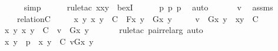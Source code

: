 \begin{isabellebody}
\ \ \ \ \isamarkupfalse%
\ simp\isanewline
\ \ \ \ \isamarkupfalse%
\ {\isacharparenleft}{\kern0pt}rule{\isacharunderscore}{\kern0pt}tac\ x{\isacharequal}{\kern0pt}{\isachardoublequoteopen}{\isacharless}{\kern0pt}x{\isacharcomma}{\kern0pt}y{\isachargreater}{\kern0pt}{\isachardoublequoteclose}\ \ bexI{\isacharparenright}{\kern0pt}\isanewline
\ \ \ \ \isamarkupfalse%
\ p{}\ p{}\ p{}\ \isamarkupfalse%
\ auto\ \isanewline
{}\isamarkupfalse%
\ \isanewline
\ \ \isamarkupfalse%
\ v\ \isamarkupfalse%
\ assms\ {\isacharcolon}{\kern0pt}\isanewline
\ \ \ \ {\isachardoublequoteopen}relation{\isacharparenleft}{\kern0pt}C{\isacharparenright}{\kern0pt}{\isachardoublequoteclose}\ \isanewline
\ \ \ \ {\isachardoublequoteopen}{\isasymforall}x{\isachardot}{\kern0pt}\ {\isasymforall}y{\isachardot}{\kern0pt}\ {\isacharless}{\kern0pt}x{\isacharcomma}{\kern0pt}\ y{\isachargreater}{\kern0pt}\ {\isasymin}\ C\ {\isasymlongrightarrow}\ F{\isacharparenleft}{\kern0pt}x{\isacharcomma}{\kern0pt}\ y{\isacharparenright}{\kern0pt}\ {\isacharequal}{\kern0pt}\ G{\isacharparenleft}{\kern0pt}x{\isacharcomma}{\kern0pt}\ y{\isacharparenright}{\kern0pt}{\isachardoublequoteclose}\ \isanewline
\ \ \ \ {\isachardoublequoteopen}v\ {\isasymin}\ {\isacharbraceleft}{\kern0pt}G{\isacharparenleft}{\kern0pt}x{\isacharcomma}{\kern0pt}\ y{\isacharparenright}{\kern0pt}\ {\isachardot}{\kern0pt}\ {\isasymlangle}x{\isacharcomma}{\kern0pt}y{\isasymrangle}\ {\isasymin}\ C{\isacharbraceright}{\kern0pt}{\isachardoublequoteclose}\isanewline
\ \ \isamarkupfalse%
\ \isamarkupfalse%
\ {\isachardoublequoteopen}{\isasymexists}x\ y{\isachardot}{\kern0pt}\ {\isasymlangle}x{\isacharcomma}{\kern0pt}\ y{\isasymrangle}\ {\isasymin}\ C\ {\isasymand}\ v\ {\isacharequal}{\kern0pt}\ G{\isacharparenleft}{\kern0pt}x{\isacharcomma}{\kern0pt}\ y{\isacharparenright}{\kern0pt}{\isachardoublequoteclose}\ \isanewline
\ \ \ \ \isamarkupfalse%
\ {\isacharparenleft}{\kern0pt}rule{\isacharunderscore}{\kern0pt}tac\ pair{\isacharunderscore}{\kern0pt}rel{\isacharunderscore}{\kern0pt}arg{\isacharsemicolon}{\kern0pt}\ auto{\isacharparenright}{\kern0pt}\isanewline
\ \ \isamarkupfalse%
\ \isamarkupfalse%
\ x\ y\ \ p{}\ {\isacharcolon}{\kern0pt}\ {\isachardoublequoteopen}{\isacharless}{\kern0pt}x{\isacharcomma}{\kern0pt}\ y{\isachargreater}{\kern0pt}\ {\isasymin}\ C{\isachardoublequoteclose}\ {\isachardoublequoteopen}v{\isacharequal}{\kern0pt}G{\isacharparenleft}{\kern0pt}x{\isacharcomma}{\kern0pt}\ y{\isacharparenright}{\kern0pt}{\isachardoublequoteclose}\ \isamarkupfalse%

\end{isabellebody}
